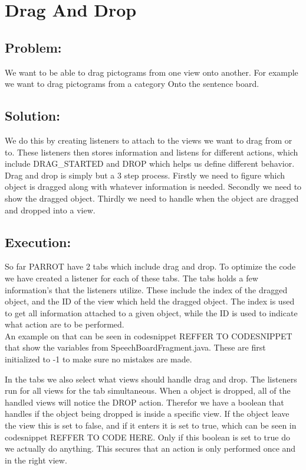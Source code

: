 \section{Drag And Drop} 
\subsection*{Problem:}
We want to be able to drag pictograms from one view onto another. 
For example we want to drag pictograms from a category Onto the sentence board. 


\subsection*{Solution:}
We do this by creating listeners to attach to the views we want to drag from or to. 
These listeners then stores information and listens for different actions, which include DRAG\_STARTED and DROP which helps us define different behavior.
Drag and drop is simply but a 3 step process.
Firstly we need to figure which object is dragged along with whatever information is needed. 
Secondly we need to show the dragged object.
Thirdly we need to handle when the object are dragged and dropped into a view.

\subsection*{Execution:}
So far PARROT have 2 tabs which include drag and drop. To optimize the code we have created a listener for each of these tabs.
The tabs holds a few information's that the listeners utilize. These include the index of the dragged object, and the ID of the view which held the dragged object. The index is used to get all information attached to a given object, while the ID is used to indicate what action are to be performed.\\
An example on that can be seen in codesnippet REFFER TO CODESNIPPET that show the variables from SpeechBoardFragment.java.
These are first initialized to -1 to make sure no mistakes are made.


In the tabs we also select what views should handle drag and drop.
The listeners run for all views for the tab simultaneous. When a object is dropped, all of the handled views will notice the DROP action. Therefor we have a boolean that handles if the object being dropped is inside a specific view. 
If the object leave the view this is set to false, and if it enters it is set to true, which can be seen in codesnippet REFFER TO CODE HERE. 
Only if this boolean is set to true do we actually do anything. This secures that an action is only performed once and in the right view. 

